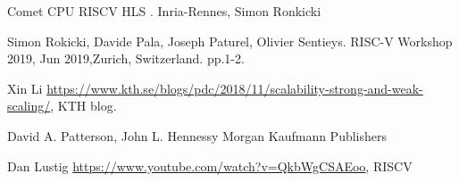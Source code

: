 \documentclass[10pt,letterpaper]{article}
\begin{document}
\begin{thebibliography}{1} 

 Comet CPU RISCV HLS
.
\newblock Inria-Rennes, Simon Ronkicki

 Simon Rokicki, Davide Pala, Joseph Paturel, Olivier Sentieys.
\newblock RISC-V Workshop 2019, Jun 2019,Zurich, Switzerland. pp.1-2.

 Xin Li
\newblock \url{https://www.kth.se/blogs/pdc/2018/11/scalability-strong-and-weak-scaling/}, KTH blog.

 David A. Patterson, John L. Hennessy
\newblock Morgan Kaufmann Publishers

 Dan Lustig
\newblock \url{https://www.youtube.com/watch?v=QkbWgCSAEoo}, RISCV

\end{thebibliography}
\end{document}
